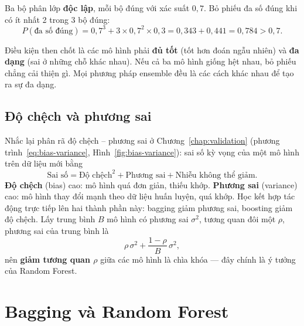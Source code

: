 \begin{example}
Ba bộ phân lớp \textbf{độc lập}, mỗi bộ đúng với xác suất $0{,}7$. Bỏ phiếu đa số đúng khi có ít nhất 2 trong 3 bộ đúng:
\begin{equation*}
    P(\text{đa số đúng}) = 0{,}7^3 + 3 \times 0{,}7^2 \times 0{,}3 = 0{,}343 + 0{,}441 = 0{,}784 > 0{,}7 .
\end{equation*}
\end{example}

Điều kiện then chốt là các mô hình phải \textbf{đủ tốt} (tốt hơn đoán ngẫu nhiên) và \textbf{đa dạng} (sai ở những chỗ khác nhau). Nếu cả ba mô hình giống hệt nhau, bỏ phiếu chẳng cải thiện gì. Mọi phương pháp ensemble đều là các cách khác nhau để tạo ra sự đa dạng.

\subsection{Độ chệch và phương sai}

Nhắc lại phân rã độ chệch -- phương sai ở Chương~\ref{chap:validation} (phương trình~\eqref{eq:bias-variance}, Hình~\ref{fig:bias-variance}): sai số kỳ vọng của một mô hình trên dữ liệu mới bằng
\begin{equation}
    \text{Sai số} = \text{Độ chệch}^2 + \text{Phương sai} + \text{Nhiễu không thể giảm}.
\end{equation}
\textbf{Độ chệch} (bias) cao: mô hình quá đơn giản, thiếu khớp. \textbf{Phương sai} (variance) cao: mô hình thay đổi mạnh theo dữ liệu huấn luyện, quá khớp. Học kết hợp tác động trực tiếp lên hai thành phần này: bagging giảm phương sai, boosting giảm độ chệch. Lấy trung bình $B$ mô hình có phương sai $\sigma^2$, tương quan đôi một $\rho$, phương sai của trung bình là
\begin{equation}
    \rho\,\sigma^2 + \frac{1 - \rho}{B}\,\sigma^2 ,
\end{equation}
nên \textbf{giảm tương quan $\rho$} giữa các mô hình là chìa khóa --- đây chính là ý tưởng của Random Forest.


\section{Bagging và Random Forest}

